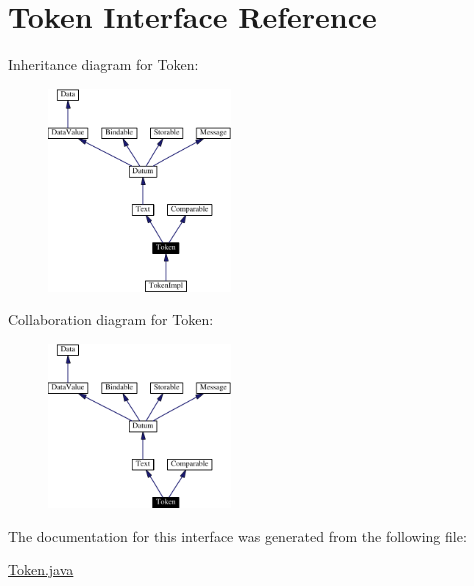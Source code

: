 \hypertarget{interfaceToken}{
\section{Token  Interface Reference}
\label{interfaceToken}
}
Inheritance diagram for Token:\begin{figure}[H]
\begin{center}
\leavevmode
\includegraphics[width=137pt]{interfaceToken__inherit__graph}
\end{center}
\end{figure}
Collaboration diagram for Token:\begin{figure}[H]
\begin{center}
\leavevmode
\includegraphics[width=137pt]{interfaceToken__coll__graph}
\end{center}
\end{figure}


The documentation for this interface was generated from the following file:\begin{CompactItemize}
\item 
\hyperlink{Token_8java-source}{Token.java}\end{CompactItemize}
